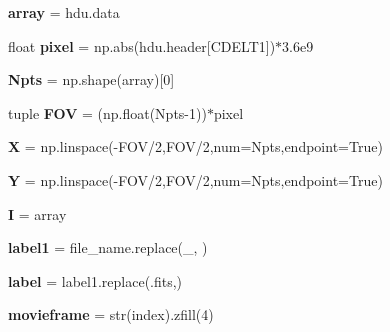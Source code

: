 \begin{DoxyCompactItemize}
\item 
\mbox{\label{namespacecharm_a41ab4b8b4e6b05e8489555b1bbc7f845}} 
{\bfseries array} = hdu.\+data
\item 
\mbox{\label{namespacecharm_a662c6bbf976045a82c97b6ee9a4fb584}} 
float {\bfseries pixel} = np.\+abs(hdu.\+header\mbox{[}\textquotesingle{}C\+D\+E\+L\+T1\textquotesingle{}\mbox{]})$\ast$3.\+6e9
\item 
\mbox{\label{namespacecharm_a93a4b79b87861da31e2c366510535a95}} 
{\bfseries Npts} = np.\+shape(array)\mbox{[}0\mbox{]}
\item 
\mbox{\label{namespacecharm_acc34245cc1b43c609c08790cf26ecebb}} 
tuple {\bfseries F\+OV} = (np.\+float(Npts-\/1))$\ast$pixel
\item 
\mbox{\label{namespacecharm_ac51b57a703ba1c5869228690c93e1701}} 
{\bfseries X} = np.\+linspace(-\/F\+OV/2,F\+OV/2,num=Npts,endpoint=True)
\item 
\mbox{\label{namespacecharm_a0867f43e27585e019c13f7f4b7c4ab6b}} 
{\bfseries Y} = np.\+linspace(-\/F\+OV/2,F\+OV/2,num=Npts,endpoint=True)
\item 
\mbox{\label{namespacecharm_a66cc12e3c6d68de3fef6de89cf033f67}} 
{\bfseries I} = array
\item 
\mbox{\label{namespacecharm_aa97ea574f414535a926d0435057b7c2d}} 
{\bfseries label1} = file\+\_\+name.\+replace(\textquotesingle{}\+\_\+\textquotesingle{},\textquotesingle{} \textquotesingle{})
\item 
\mbox{\label{namespacecharm_a22f45a3cb4f074e609f58ebaeef0ecf9}} 
{\bfseries label} = label1.\+replace(\textquotesingle{}.fits\textquotesingle{},\textquotesingle{}\textquotesingle{})
\item 
\mbox{\label{namespacecharm_a6ef879b9d6d5a3e2677a977faff2600e}} 
{\bfseries movieframe} = str(index).zfill(4)
\item 
\mbox{\label{namespacecharm_a23d0c7d8c59aa5bf202e86e0ee3d97f7}} 

\end{DoxyCompactItemize}
